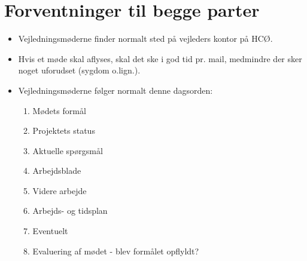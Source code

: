 \documentclass{article}
\begin{document}
\section{Forventninger til begge parter}

\begin{itemize}
    \item Vejledningsmøderne finder normalt sted på vejleders kontor på HCØ.
    \item Hvis et møde skal aflyses, skal det ske i god tid pr. mail, medmindre der sker noget uforudset (sygdom o.lign.).
    \item Vejledningsmøderne følger normalt denne dagsorden:
    \begin{enumerate}
        \item Mødets formål
        \item Projektets status
        \item Aktuelle spørgsmål
        \item Arbejdsblade
        \item Videre arbejde
        \item Arbejds- og tidsplan
        \item Eventuelt
        \item Evaluering af mødet - blev formålet opflyldt?
    \end{enumerate}
\end{itemize}
\end{document}
